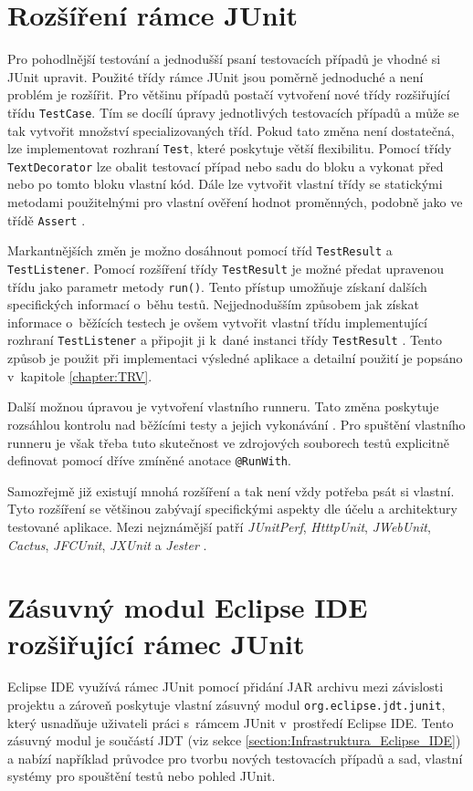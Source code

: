   \section{Rozšíření rámce JUnit}
  \label{section:rozsireni_ramce_junit}
  Pro pohodlnější testování a jednodušší psaní testovacích případů je vhodné si JUnit upravit. Použité třídy rámce JUnit jsou poměrně jednoduché a není problém je rozšířit. Pro většinu případů postačí vytvoření nové třídy rozšiřující třídu \texttt{TestCase}. Tím se docílí úpravy jednotlivých testovacích případů a může se tak vytvořit množství specializovaných tříd. Pokud tato změna není dostatečná, lze implementovat rozhraní \texttt{Test}, které poskytuje větší flexibilitu. Pomocí třídy \texttt{TextDecorator} lze obalit testovací případ nebo sadu do bloku a vykonat před nebo po tomto bloku vlastní kód. Dále lze vytvořit vlastní třídy se statickými metodami použitelnými pro vlastní ověření hodnot proměnných, podobně jako ve třídě \texttt{Assert} \cite{JUnitGuide}.

  Markantnějších změn je možno dosáhnout pomocí tříd \texttt{TestResult} a \texttt{TestListener}. Pomocí rozšíření třídy \texttt{TestResult} je možné předat upravenou třídu jako parametr metody \texttt{run()}. Tento přístup umožňuje získaní dalších specifických informací o~běhu testů. Nejjednodušším způsobem jak získat informace o~běžících testech je ovšem vytvořit vlastní třídu implementující rozhraní \texttt{TestListener} a připojit ji k~dané instanci třídy \texttt{TestResult} \cite{JUnitGuide}. Tento způsob je použit při implementaci výsledné aplikace a detailní použití je popsáno v~kapitole \ref{chapter:TRV}.

  Další možnou úpravou je vytvoření vlastního runneru. Tato změna poskytuje rozsáhlou kontrolu nad běžícími testy a jejich vykonávání \cite{JUnitGuide}. Pro spuštění vlastního runneru je však třeba tuto skutečnost ve zdrojových souborech testů explicitně definovat pomocí dříve zmíněné anotace \texttt{@RunWith}.

  Samozřejmě již existují mnohá rozšíření a tak není vždy potřeba psát si vlastní. Tyto rozšíření se většinou zabývají specifickými aspekty dle účelu a architektury testované aplikace. Mezi nejznámější patří \emph{JUnitPerf}, \emph{HtttpUnit}, \emph{JWebUnit}, \emph{Cactus}, \emph{JFCUnit}, \emph{JXUnit} a \emph{Jester} \cite{JUnitGuide}.

  \section{Zásuvný modul Eclipse IDE rozšiřující rámec JUnit}
  Eclipse IDE využívá rámec JUnit pomocí přidání JAR archivu mezi závislosti projektu a zároveň poskytuje vlastní zásuvný modul \texttt{org.eclipse.jdt.junit}, který usnadňuje uživateli práci s~rámcem JUnit v~prostředí Eclipse IDE. Tento zásuvný modul je součástí JDT (viz sekce \ref{section:Infrastruktura_Eclipse_IDE}) a nabízí například průvodce pro tvorbu nových testovacích případů a sad, vlastní systémy pro spouštění testů nebo pohled JUnit.

